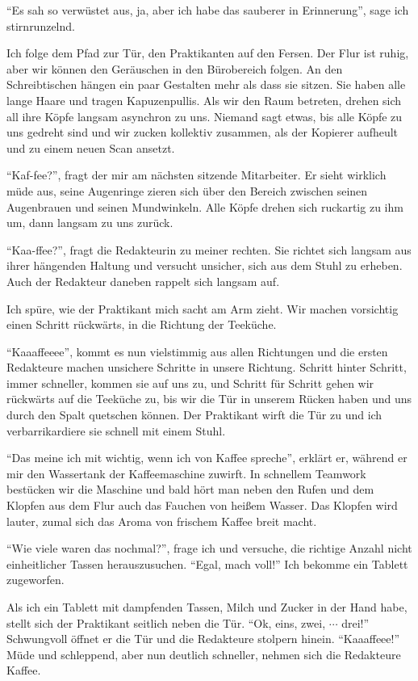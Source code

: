 \documentclass[final]{multiversum}
\begin{document}
\enquote{Es sah so verwüstet aus, ja, aber ich habe das sauberer in Erinnerung}, sage ich stirnrunzelnd.

Ich folge dem Pfad zur Tür, den Praktikanten auf den Fersen.
Der Flur ist ruhig, aber wir können den Geräuschen in den Bürobereich folgen.
An den Schreibtischen hängen ein paar Gestalten mehr als dass sie sitzen.
Sie haben alle lange Haare und tragen Kapuzenpullis.
Als wir den Raum betreten, drehen sich all ihre Köpfe langsam asynchron zu uns.
Niemand sagt etwas, bis alle Köpfe zu uns gedreht sind und wir zucken kollektiv zusammen, als der Kopierer aufheult und zu einem neuen Scan ansetzt.

\enquote{Kaf-fee?}, fragt der mir am nächsten sitzende Mitarbeiter.
Er sieht wirklich müde aus, seine Augenringe zieren sich über den Bereich zwischen seinen Augenbrauen und seinen Mundwinkeln.
Alle Köpfe drehen sich ruckartig zu ihm um, dann langsam zu uns zurück.

\enquote{Kaa-ffee?}, fragt die Redakteurin zu meiner rechten.
Sie richtet sich langsam aus ihrer hängenden Haltung und versucht unsicher, sich aus dem Stuhl zu erheben.
Auch der Redakteur daneben rappelt sich langsam auf.

Ich spüre, wie der Praktikant mich sacht am Arm zieht.
Wir machen vorsichtig einen Schritt rückwärts, in die Richtung der Teeküche.

\enquote{Kaaaffeeee}, kommt es nun vielstimmig aus allen Richtungen und die ersten Redakteure machen unsichere Schritte in unsere Richtung.
Schritt hinter Schritt, immer schneller, kommen sie auf uns zu, und Schritt für Schritt gehen wir rückwärts auf die Teeküche zu, bis wir die Tür in unserem Rücken haben und uns durch den Spalt quetschen können.
Der Praktikant wirft die Tür zu und ich verbarrikardiere sie schnell mit einem Stuhl.

\enquote{Das meine ich mit wichtig, wenn ich von Kaffee spreche}, erklärt er, während er mir den Wassertank der Kaffeemaschine zuwirft.
In schnellem Teamwork bestücken wir die Maschine und bald hört man neben den Rufen und dem Klopfen aus dem Flur auch das Fauchen von heißem Wasser.
Das Klopfen wird lauter, zumal sich das Aroma von frischem Kaffee breit macht.

\enquote{Wie viele waren das nochmal?}, frage ich und versuche, die richtige Anzahl nicht einheitlicher Tassen herauszusuchen.
\enquote{Egal, mach voll!}
Ich bekomme ein Tablett zugeworfen.

Als ich ein Tablett mit dampfenden Tassen, Milch und Zucker in der Hand habe, stellt sich der Praktikant seitlich neben die Tür.
\enquote{Ok, eins, zwei, $\cdots$ drei!}
Schwungvoll öffnet er die Tür und die Redakteure stolpern hinein.
\enquote{Kaaaffeee!}
Müde und schleppend, aber nun deutlich schneller, nehmen sich die Redakteure Kaffee.
\end{document}
